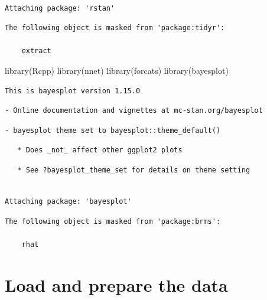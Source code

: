 \documentclass[
  letterpaper,
  DIV=11,
  numbers=noendperiod]{scrartcl}
\newenvironment{Shaded}{\begin{snugshade}}{\end{snugshade}}
\newcommand{\FunctionTok}[1]{\textcolor[rgb]{0.28,0.35,0.67}{#1}}
\newcommand{\NormalTok}[1]{\textcolor[rgb]{0.00,0.23,0.31}{#1}}
\begin{document}
\begin{verbatim}

Attaching package: 'rstan'
\end{verbatim}

\begin{verbatim}
The following object is masked from 'package:tidyr':

    extract
\end{verbatim}

\begin{Shaded}
\begin{Highlighting}[]
\FunctionTok{library}\NormalTok{(Rcpp)}
\FunctionTok{library}\NormalTok{(nnet)}
\FunctionTok{library}\NormalTok{(forcats)}
\FunctionTok{library}\NormalTok{(bayesplot)}
\end{Highlighting}
\end{Shaded}

\begin{verbatim}
This is bayesplot version 1.15.0
\end{verbatim}

\begin{verbatim}
- Online documentation and vignettes at mc-stan.org/bayesplot
\end{verbatim}

\begin{verbatim}
- bayesplot theme set to bayesplot::theme_default()
\end{verbatim}

\begin{verbatim}
   * Does _not_ affect other ggplot2 plots
\end{verbatim}

\begin{verbatim}
   * See ?bayesplot_theme_set for details on theme setting
\end{verbatim}

\begin{verbatim}

Attaching package: 'bayesplot'
\end{verbatim}

\begin{verbatim}
The following object is masked from 'package:brms':

    rhat
\end{verbatim}

\section{Load and prepare the data}\label{load-and-prepare-the-data}
\end{document}
